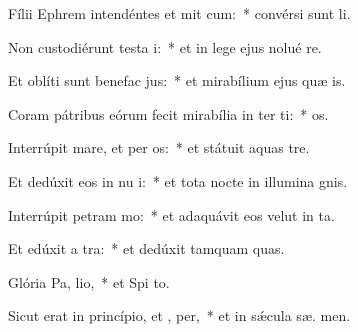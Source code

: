 \item Fílii Ephrem intendéntes et mit cum:~* convérsi sunt   li.
\item Non custodiérunt testa i:~* et in lege ejus nolué re.
\item Et oblíti sunt benefac jus:~* et mirabílium ejus quæ  is.
\item Coram pátribus eórum fecit mirabília in ter ti:~*   os.
\item Interrúpit mare, et per os:~* et státuit aquas   tre.
\item Et dedúxit eos in nu i:~* et tota nocte in illumina gnis.
\item Interrúpit petram  mo:~* et adaquávit eos velut in  ta.
\item Et edúxit a  tra:~* et dedúxit tamquam  quas.
\item Glória Pa,  lio,~* et Spi to.
\item Sicut erat in princípio, et ,  per,~* et in sǽcula sæ. men.
